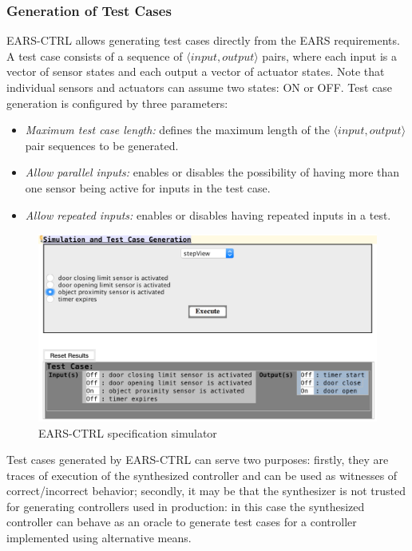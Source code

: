 \subsubsection{Generation of Test Cases}
\textsf{EARS-CTRL} allows generating test cases directly from the EARS
requirements. A test case consists of a sequence of $\langle
input, output \rangle$ pairs, where each input is a vector of sensor states
and each output a vector of actuator states. Note that individual sensors and
actuators can assume two states: \textsf{ON} or \textsf{OFF}. Test case
generation is configured by three parameters:
\begin{itemize}
  \item \emph{Maximum test case length:} defines the maximum length of the
  $\langle input, output \rangle$ pair sequences to be generated.
  \item \emph{Allow parallel inputs:} enables or disables the possibility of
  having more than one sensor being active for inputs in the test case.
  \item \emph{Allow repeated inputs:} enables or disables having repeated inputs
  in a test.
\end{itemize}
\begin{figure}[h!]
   \begin{center}
     \includegraphics[width=.85\textwidth]{images/simulation.png} 
     \caption{\textsf{EARS-CTRL} specification simulator}
     \label{fig:ears_simulator} 
   \end{center}
 \end{figure}
Test cases generated by \textsf{EARS-CTRL} can serve two purposes: firstly, they
are traces of execution of the synthesized controller and can be used as
witnesses of correct/incorrect behavior; secondly, it may be that the
synthesizer is not trusted for generating controllers used in production:
in this case the synthesized controller can behave as an oracle to generate test
cases for a controller implemented using alternative means.
